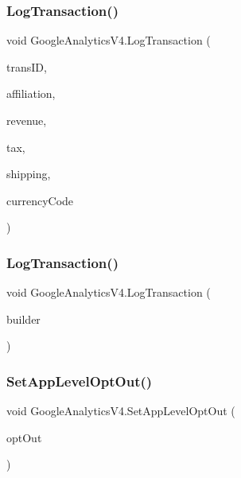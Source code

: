 \subsubsection{\texorpdfstring{Log\+Transaction()}{LogTransaction()}\hspace{0.1cm}{\footnotesize\ttfamily [2/3]}}
{\footnotesize\ttfamily void Google\+Analytics\+V4.\+Log\+Transaction (\begin{DoxyParamCaption}\item[{string}]{trans\+ID,  }\item[{string}]{affiliation,  }\item[{double}]{revenue,  }\item[{double}]{tax,  }\item[{double}]{shipping,  }\item[{string}]{currency\+Code }\end{DoxyParamCaption})}

\mbox{\label{class_google_analytics_v4_a7001e127fd4b35d28438fa831e8959ec}} 
\subsubsection{\texorpdfstring{Log\+Transaction()}{LogTransaction()}\hspace{0.1cm}{\footnotesize\ttfamily [3/3]}}
{\footnotesize\ttfamily void Google\+Analytics\+V4.\+Log\+Transaction (\begin{DoxyParamCaption}\item[{\hyperlink{class_transaction_hit_builder}{Transaction\+Hit\+Builder}}]{builder }\end{DoxyParamCaption})}

\mbox{\label{class_google_analytics_v4_aa7cf5f1f2b35c21f7f5257df6d016479}} 
\subsubsection{\texorpdfstring{Set\+App\+Level\+Opt\+Out()}{SetAppLevelOptOut()}}
{\footnotesize\ttfamily void Google\+Analytics\+V4.\+Set\+App\+Level\+Opt\+Out (\begin{DoxyParamCaption}\item[{bool}]{opt\+Out }\end{DoxyParamCaption})}

